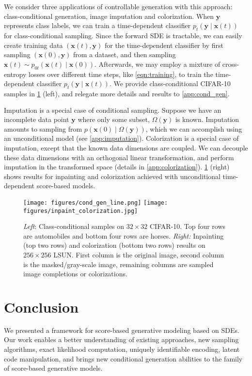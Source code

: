 \documentclass{article} \usepackage{iclr2021_conference,times}
\newcommand{\bfx}{\mathbf{x}}
\newcommand{\bfy}{\mathbf{y}}
\begin{document}
We consider three applications of controllable generation with this approach: class-conditional generation, image imputation and colorization. When $\bfy$ represents class labels, we can train a time-dependent classifier $p_t(\bfy \mid \bfx(t))$ for class-conditional sampling. Since the forward SDE is tractable, we can easily create training data $(\bfx(t), \bfy)$ for the time-dependent classifier
by first sampling $(\bfx(0), \bfy)$ from a dataset, and then sampling $\bfx(t) \sim p_{0t}(\bfx(t) \mid \bfx(0))$. Afterwards, we may employ a mixture of cross-entropy losses over different time steps, like \cref{eqn:training}, to train the time-dependent classifier $p_t(\bfy \mid \bfx(t))$. We provide class-conditional CIFAR-10 samples in \cref{fig:cond_gen} (left), and relegate more details and results to \cref{app:cond_gen}.

Imputation is a special case of conditional sampling.
Suppose we have an incomplete data point $\bfy$ where only some subset, $\Omega(\bfy)$ is known. Imputation amounts to sampling from $p(\bfx(0) \mid \Omega(\bfy))$, which we can accomplish using an unconditional model (see \cref{app:imputation}). Colorization is a special case of imputation, except that the known data dimensions are coupled. We can decouple these data dimensions with an orthogonal linear transformation, and perform imputation in the transformed space (details in \cref{app:colorization}). \cref{fig:cond_gen} (right) shows results for inpainting and colorization achieved with unconditional time-dependent score-based models.


\begin{figure}
    \centering
    \texttt{[image: figures/cond\_gen\_line.png]}
    \texttt{[image: figures/inpaint\_colorization.jpg]}
    \caption{\textit{Left}: Class-conditional samples on $32\times 32$ CIFAR-10. Top four rows are automobiles and bottom four rows are horses. \textit{Right:} Inpainting (top two rows) and colorization (bottom two rows) results on $256\times 256$ LSUN. First column is the original image, second column is the masked/gray-scale image, remaining columns are sampled image completions or colorizations.}
    \label{fig:cond_gen}
\end{figure}
 \section{Conclusion}
We presented a framework for score-based generative modeling based on SDEs. Our work enables a better understanding of existing approaches,  new sampling algorithms, exact likelihood computation, uniquely identifiable encoding, latent code manipulation, and brings new conditional generation abilities to the family of score-based generative models.
\end{document}
